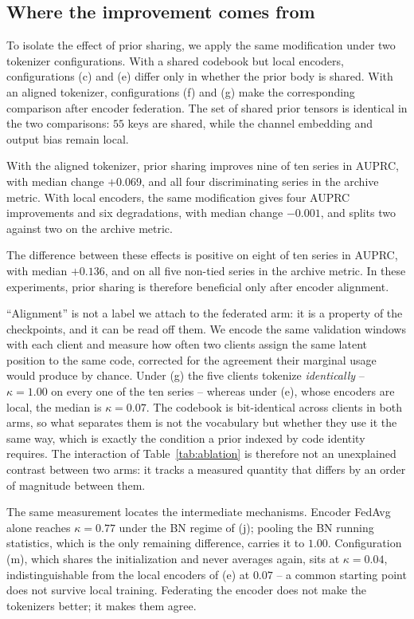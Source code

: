 \documentclass[conference]{IEEEtran}
\begin{document}
\subsection{Where the improvement comes from}
\label{subsec:interaction}

To isolate the effect of prior sharing, we apply the same modification under two tokenizer configurations. With a shared codebook but local encoders, configurations (c) and (e) differ only in whether the prior body is shared. With an aligned tokenizer, configurations (f) and (g) make the corresponding comparison after encoder federation. The set of shared prior tensors is identical in the two comparisons: $55$ keys are shared, while the channel embedding and output bias remain local.

With the aligned tokenizer, prior sharing improves nine of ten series in AUPRC, with median change $+0.069$, and all four discriminating series in the archive metric. With local encoders, the same modification gives four AUPRC improvements and six degradations, with median change $-0.001$, and splits two against two on the archive metric.

The difference between these effects is positive on eight of ten series in AUPRC, with median $+0.136$, and on all five non-tied series in the archive metric. In these experiments, prior sharing is therefore beneficial only after encoder alignment.

``Alignment'' is not a label we attach to the federated arm: it is a property of the checkpoints,
and it can be read off them. We encode the same validation windows with each client and measure how
often two clients assign the same latent position to the same code, corrected for the agreement
their marginal usage would produce by chance. Under (g) the five clients tokenize \emph{identically}
-- $\kappa=1.00$ on every one of the ten series -- whereas under (e), whose encoders are local, the
median is $\kappa=0.07$. The codebook is bit-identical across clients in both arms, so what
separates them is not the vocabulary but whether they use it the same way, which is exactly the
condition a prior indexed by code identity requires. The interaction of Table~\ref{tab:ablation} is
therefore not an unexplained contrast between two arms: it tracks a measured quantity that differs
by an order of magnitude between them.

The same measurement locates the intermediate mechanisms. Encoder FedAvg alone reaches
$\kappa=0.77$ under the BN regime of (j); pooling the BN running statistics, which is the only
remaining difference, carries it to $1.00$. Configuration (m), which shares the initialization and
never averages again, sits at $\kappa=0.04$, indistinguishable from the local encoders of (e) at
$0.07$ -- a common starting point does not survive local training. Federating the encoder does not
make the tokenizers better; it makes them agree.
\end{document}

